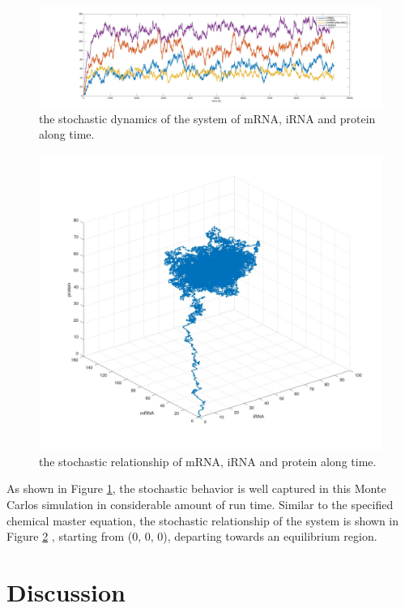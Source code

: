 \documentclass[fleqn,10pt]{wlscirep}
\begin{document}
\begin{figure}[ht]
\centering
\includegraphics[width=\linewidth]{stochsim}
\caption{the stochastic dynamics of the system of mRNA, iRNA and protein along time.}
\label{fig:stochsim} 
\end{figure}

\begin{figure}[ht]
\centering
\includegraphics[width=\linewidth]{gridstochsim}
\caption{the stochastic relationship of mRNA, iRNA and protein along time.}
\label{fig:gridstochsim} 
\end{figure}

As shown in Figure \ref{fig:stochsim}, the stochastic behavior is well captured in this Monte Carlos simulation in considerable amount of run time. Similar to the specified chemical master equation, the stochastic relationship of the system is shown in Figure \ref{fig:gridstochsim} , starting from (0, 0, 0), departing towards an equilibrium region.

\section*{Discussion}
\end{document}
